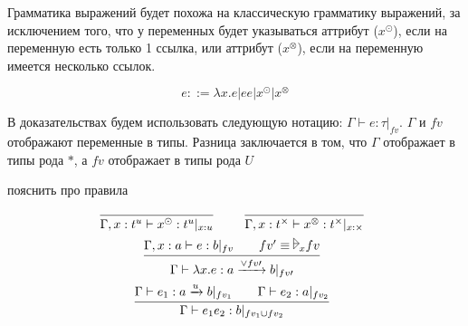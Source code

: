 Грамматика выражений будет похожа на классическую грамматику выражений, за исключением того,
что у переменных будет указываться аттрибут ($x^\odot$), если на переменную есть только 1 ссылка,
или аттрибут ($x^\otimes$), если на переменную имеется несколько ссылок.
\begin{bnf}
\[
	e ::= \lambda x.e | ee | x^\odot | x^\otimes
\]
\end{bnf}
В доказательствах будем использовать следующую нотацию: $\Gamma \vdash e : \tau |_{fv}$.
$\Gamma$ и $fv$ отображают переменные в типы. 
Разница заключается в том, что $\Gamma$ отображает в типы рода $*$,
а $fv$ отображает в типы рода $U$

\todo пояснить про правила
\begin{@empty}
\inferspacing
\begin{gather*}
	\infer[]{\Gamma, x : t^u \vdash x^\odot : t^u |_{x:u}}{} \qquad
	\infer[]{\Gamma, x : t^\times \vdash x^\otimes : t^\times |_{x:\times}}{} \\
	\infer[]
		{\Gamma \vdash \lambda x.e : a \xrightarrow{\vee fv\prime} b |_{fv\prime}}
		{\Gamma, x : a \vdash e : b |_{fv} && fv' \equiv \fuck_x fv} \\
	\infer[]
		{\Gamma \vdash e_1e_2 : b |_{fv_1 \cup fv_2}}
		{\Gamma \vdash e_1 : a \xrightarrow{u} b |_{fv_1} \qquad \Gamma \vdash e_2 : a |_{fv_2}}
\end{gather*}
\end{@empty}
